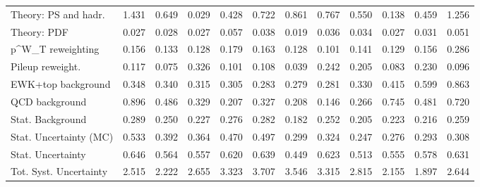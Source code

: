 \begin{tabular}{l|p{0.6cm}p{0.6cm}p{0.6cm}p{0.6cm}p{0.6cm}p{0.6cm}p{0.6cm}p{0.6cm}p{0.6cm}p{0.6cm}p{0.6cm}}
Theory: PS and hadr.                     & 1.431 & 0.649 & 0.029 & 0.428 & 0.722 & 0.861 & 0.767 & 0.550 & 0.138 & 0.459 & 1.256 \\
Theory: PDF                              & 0.027 & 0.028 & 0.027 & 0.057 & 0.038 & 0.019 & 0.036 & 0.034 & 0.027 & 0.031 & 0.051 \\
p^{W}_{T} reweighting                    & 0.156 & 0.133 & 0.128 & 0.179 & 0.163 & 0.128 & 0.101 & 0.141 & 0.129 & 0.156 & 0.286 \\
Pileup reweight.                         & 0.117 & 0.075 & 0.326 & 0.101 & 0.108 & 0.039 & 0.242 & 0.205 & 0.083 & 0.230 & 0.096 \\
EWK+top background                       & 0.348 & 0.340 & 0.315 & 0.305 & 0.283 & 0.279 & 0.281 & 0.330 & 0.415 & 0.599 & 0.863 \\
QCD background                           & 0.896 & 0.486 & 0.329 & 0.207 & 0.327 & 0.208 & 0.146 & 0.266 & 0.745 & 0.481 & 0.720 \\
Stat. Background                         & 0.289 & 0.250 & 0.227 & 0.276 & 0.282 & 0.182 & 0.252 & 0.205 & 0.223 & 0.216 & 0.259 \\
Stat. Uncertainty (MC)                   & 0.533 & 0.392 & 0.364 & 0.470 & 0.497 & 0.299 & 0.324 & 0.247 & 0.276 & 0.293 & 0.308 \\
\hline
Stat. Uncertainty                        & 0.646 & 0.564 & 0.557 & 0.620 & 0.639 & 0.449 & 0.623 & 0.513 & 0.555 & 0.578 & 0.631 \\
\hline
Tot. Syst. Uncertainty                   & 2.515 & 2.222 & 2.655 & 3.323 & 3.707 & 3.546 & 3.315 & 2.815 & 2.155 & 1.897 & 2.644 \\
\hline
\end{tabular}
